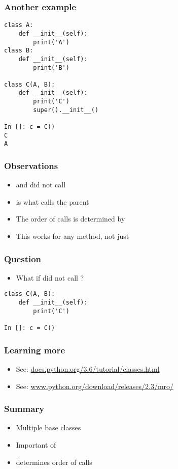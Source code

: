 \documentclass[14pt,compress,aspectratio=169]{beamer}
\begin{document}
\begin{frame}
  \frametitle{Another example}
  \small
  \vspace*{-0.1in}
  \begin{lstlisting}
class A:
    def __init__(self):
        print('A')
class B:
    def __init__(self):
        print('B')

class C(A, B):
    def __init__(self):
        print('C')
        super().__init__()

In []: c = C()
C
A
\end{lstlisting}

\end{frame}

\begin{frame}
  \frametitle{Observations}
  \begin{itemize}
  \item {} and  did not call 
  \item {} is what calls the parent 
  \item The order of calls is determined by 
  \item This works for any method, not just 
  \end{itemize}
\end{frame}

\begin{frame}[fragile]
  \frametitle{Question}
  \begin{itemize}
  \item What if  did not call ?
  \end{itemize}
  \begin{lstlisting}
class C(A, B):
    def __init__(self):
        print('C')

In []: c = C()
  \end{lstlisting}
\end{frame}

\begin{frame}
  \frametitle{Learning more}
  \begin{itemize}
  \item See: \url{docs.python.org/3.6/tutorial/classes.html}
  \item See: \url{www.python.org/download/releases/2.3/mro/}
  \end{itemize}
\end{frame}

\begin{frame}
  \frametitle{Summary}
  \begin{itemize}
  \item Multiple base classes
  \item Important of 
  \item {} determines order of calls
  \end{itemize}
\end{frame}
\end{document}
